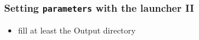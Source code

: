 \documentclass[9pt]{beamer}
\begin{document}
{
\begin{frame}[fragile]
  \frametitle{Setting {\tt parameters} with the launcher II}

\vspace{7.25cm}

\begin{block}{}
\begin{itemize}
\item fill at least the Output directory
\end{itemize}
\end{block}

\end{frame}
}

\end{document}
